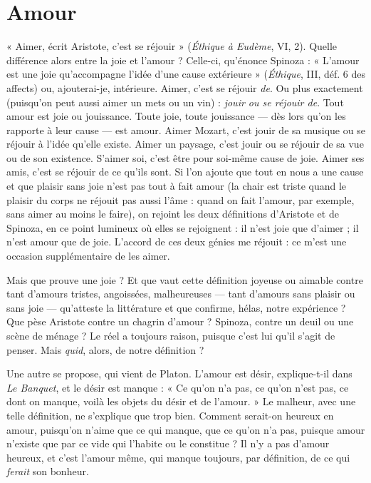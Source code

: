 \section{Amour}
« Aimer, écrit Aristote, c’est se réjouir » ({\it Éthique à Eudème}, VI, 2).
Quelle différence alors entre la joie et l’amour ? Celle-ci, qu'énonce
Spinoza : « L'amour est une joie qu’accompagne l’idée d’une cause extérieure »
({\it Éthique}, III, déf. 6 des affects) ou, ajouterai-je, intérieure. Aimer, c’est se
réjouir {\it de}. Ou plus exactement (puisqu'on peut aussi aimer un mets ou un
vin) : {\it jouir ou se réjouir de}. Tout amour est joie ou jouissance. Toute joie, toute
jouissance — dès lors qu’on les rapporte à leur cause — est amour. Aimer Mozart,
c’est jouir de sa musique ou se réjouir à l’idée qu’elle existe. Aimer un paysage,
c’est jouir ou se réjouir de sa vue ou de son existence. S’aimer soi, c'est être
pour soi-même cause de joie. Aimer ses amis, c’est se réjouir de ce qu'ils sont.
Si l’on ajoute que tout en nous a une cause et que plaisir sans joie n'est pas tout
à fait amour (la chair est triste quand le plaisir du corps ne réjouit pas aussi
l’âme : quand on fait l'amour, par exemple, sans aimer au moins le faire), on
rejoint les deux définitions d’Aristote et de Spinoza, en ce point lumineux où
elles se rejoignent : il n’est joie que d’aimer ; il n’est amour que de joie.
L'accord de ces deux génies me réjouit : ce m'est une occasion supplémentaire
de les aimer.

Mais que prouve une joie ? Et que vaut cette définition joyeuse ou aimable
contre tant d’amours tristes, angoissées, malheureuses — tant d’amours sans
plaisir ou sans joie — qu’atteste la littérature et que confirme, hélas, notre
expérience ? Que pèse Aristote contre un chagrin d'amour ? Spinoza, contre un
deuil ou une scène de ménage ? Le réel a toujours raison, puisque c’est lui qu’il
s’agit de penser. Mais {\it quid}, alors, de notre définition ?

Une autre se propose, qui vient de Platon. L'amour est désir, explique-t-il
dans {\it Le Banquet}, et le désir est manque : « Ce qu’on n’a pas, ce qu’on n’est pas,
ce dont on manque, voilà les objets du désir et de l’amour. » Le malheur, avec
une telle définition, ne s'explique que trop bien. Comment serait-on heureux
en amour, puisqu'on n’aime que ce qui manque, que ce qu’on n’a pas, puisque
amour n'existe que par ce vide qui l’habite ou le constitue ? Il n’y a pas
d'amour heureux, et c’est l'amour même, qui manque toujours, par définition,
de ce qui {\it ferait} son bonheur.

